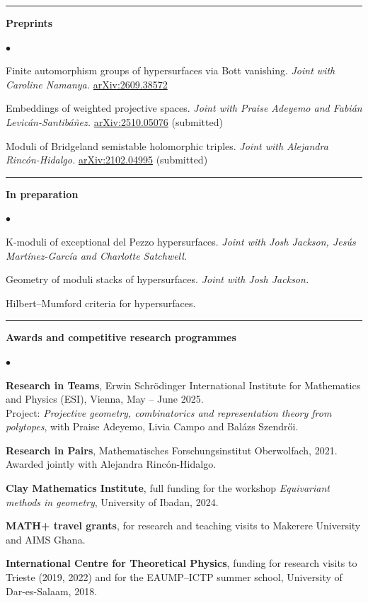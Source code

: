 \documentclass[10pt]{article}
\newcommand{\cvsection}[1]{%
  \par\vspace{0.24cm}%
  \noindent\rule{\textwidth}{0.4pt}%
  \par\vspace{0.12cm}%
  \noindent\textbf{\large #1}%
  \par\vspace{0.12cm}%
}
\newenvironment{cvlist}%
  {\begin{list}{$\bullet$}{%
     \setlength{\leftmargin}{1.1em}\setlength{\labelwidth}{0.8em}%
     \setlength{\itemsep}{0.12cm}\setlength{\parsep}{0pt}%
     \setlength{\topsep}{0pt}\setlength{\partopsep}{0pt}}}%
  {\end{list}}
\begin{document}
\cvsection{Preprints}
\begin{cvlist}
\item Finite automorphism groups of hypersurfaces via Bott vanishing.
{\em Joint with Caroline Namanya.}
\href{https://arxiv.org/abs/2609.38572}{arXiv:2609.38572}
\item Embeddings of weighted projective spaces.
{\em Joint with Praise Adeyemo and Fabi\'an Levic\'an-Santib\'a\~nez.}
\href{https://arxiv.org/abs/2510.05076}{arXiv:2510.05076} (submitted)
\item Moduli of Bridgeland semistable holomorphic triples.
{\em Joint with Alejandra Rinc\'on-Hidalgo.}
\href{https://arxiv.org/abs/2102.04995}{arXiv:2102.04995} (submitted)
\end{cvlist}

\cvsection{In preparation}
\begin{cvlist}
\item K-moduli of exceptional del Pezzo hypersurfaces.
{\em Joint with Josh Jackson, Jes\'us Mart\'inez-Garc\'ia and Charlotte Satchwell.}
\item Geometry of moduli stacks of hypersurfaces. {\em Joint with Josh Jackson.}
\item Hilbert--Mumford criteria for hypersurfaces.
\end{cvlist}

\cvsection{Awards and competitive research programmes}
\begin{cvlist}
\item {\bf Research in Teams}, Erwin Schr\"odinger International Institute for
Mathematics and Physics (ESI), Vienna, May -- June 2025.\\
Project: {\em Projective geometry, combinatorics and representation theory from
polytopes}, with Praise Adeyemo, Livia Campo and Bal\'azs Szendr\H{o}i.
\item {\bf Research in Pairs}, Mathematisches Forschungsinstitut Oberwolfach,
2021.\\
Awarded jointly with Alejandra Rinc\'on-Hidalgo.
\item {\bf Clay Mathematics Institute}, full funding for the workshop
{\em Equivariant methods in geometry}, University of Ibadan, 2024.
\item {\bf MATH+ travel grants}, for research and teaching visits to Makerere
University and AIMS Ghana.
\item {\bf International Centre for Theoretical Physics}, funding for research
visits to Trieste (2019, 2022) and for the EAUMP--ICTP summer school,
University of Dar-es-Salaam, 2018.
\end{cvlist}
\end{document}
